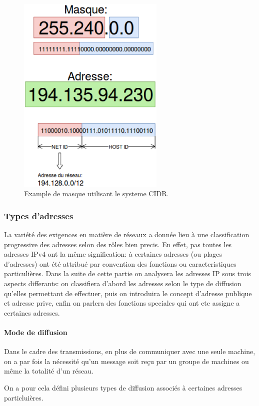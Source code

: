 \begin{figure}
\centering
\includegraphics[width=7cm]{./pics/maskipv4cidr.eps}
\caption{Example de masque utilisant le systeme CIDR.}
\label{fig:exmask}
\end{figure}


\subsubsection{Types d'adresses}
La variété des exigences en matière de réseaux a donnée lieu à une
classification progressive des adresses selon des rôles bien precis. En effet,
pas toutes les adresses IPv4 ont la même signification: à certaines adresses
(ou plages d'adresses) ont été attribué par convention des fonctions ou
caracteristiques particulières.  Dans la suite de cette partie on analysera les
adresses IP sous trois aspects differants: on classifiera d'abord les adresses selon
le type de diffusion qu'elles permettant de effectuer, puis on introduira le
concept d'adresse publique et adresse prive, enfin on parlera des fonctions
speciales qui ont ete assigne a certaines adresses.


\paragraph{Mode de diffusion}
Dans le cadre des transmissions, en plus de communiquer avec une seule machine, on
a par fois la nécessité qu'un message soit reçu par un groupe de machines ou
même la totalité d'un réseau.

On a pour cela défini plusieurs types de diffusion associés à certaines adresses particluières.

